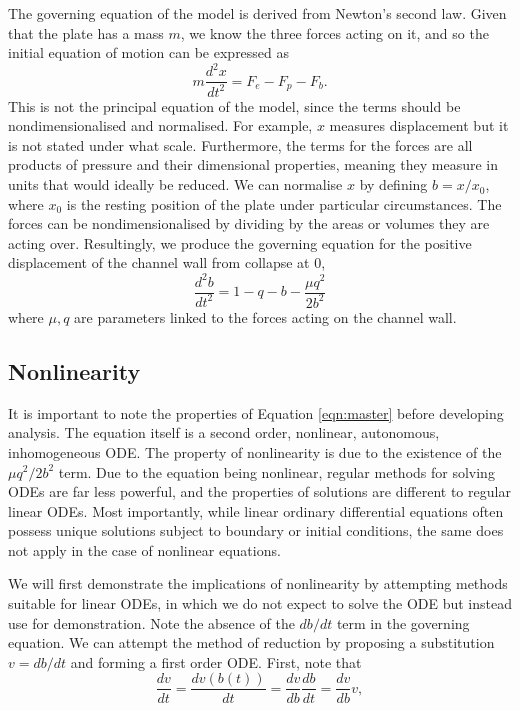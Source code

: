 \documentclass{article}
\begin{document}
The governing equation of the model is derived from Newton's second law.
Given that the plate has a mass $m$, we know the three forces acting on it,
and so the initial equation of motion can be expressed as
\begin{equation}
    m\frac{d^2 x}{dt^2} = F_e - F_p - F_b.
    \label{eqn:model_init}
\end{equation}
This is not the principal equation of the model,
since the terms should be nondimensionalised and normalised.
For example, $x$ measures displacement but it is not stated under what scale.
Furthermore, the terms for the forces are all products of pressure and their dimensional properties,
meaning they measure in units that would ideally be reduced.
We can normalise $x$ by defining $b = x/x_0$, where $x_0$ is the resting position of the plate under particular circumstances. %
The forces can be nondimensionalised by dividing by the areas or volumes they are acting over.
Resultingly, we produce the governing equation for the positive displacement of the channel wall from collapse at $0$,
\begin{equation}
    \frac{d^2b}{dt^2} = 1 - q - b - \frac{\mu q^2}{2b^2}
    \label{eqn:master}
\end{equation}
where $\mu, q$ are parameters linked to the forces acting on the channel wall.


\subsection{Nonlinearity}

It is important to note the properties of Equation \ref{eqn:master} before developing analysis.
The equation itself is a second order, nonlinear, autonomous, inhomogeneous ODE.
The property of nonlinearity is due to the existence of the $\mu q^2/2b^2$ term.
Due to the equation being nonlinear, regular methods for solving ODEs are far less powerful,
and the properties of solutions are different to regular linear ODEs.
Most importantly, while linear ordinary differential equations often possess unique solutions subject to boundary or initial conditions,
the same does not apply in the case of nonlinear equations.

We will first demonstrate the implications of nonlinearity by attempting methods suitable for linear ODEs,
in which we do not expect to solve the ODE but instead use for demonstration.
Note the absence of the $db/dt$ term in the governing equation.
We can attempt the method of reduction by proposing a substitution $v=db/dt$ and forming a first order ODE.
First, note that
\begin{equation}
    \frac{dv}{dt} = \frac{dv(b(t))}{dt} = \frac{dv}{db}\frac{db}{dt} = \frac{dv}{db}v,
\end{equation}
\end{document}
